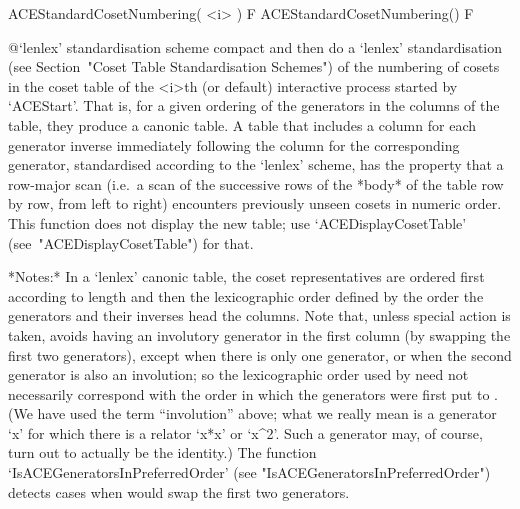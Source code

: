 \>ACEStandardCosetNumbering( <i> ) F
\>ACEStandardCosetNumbering() F

%
{@\noexpand`lenlex' standardisation scheme}
compact and then do a  `lenlex'  standardisation  (see  Section~"Coset
Table Standardisation Schemes") of the  numbering  of  cosets  in  the
coset table of the  <i>th  (or  default)  interactive  {\ACE}  process
started by `ACEStart'. That is, for a given ordering of the generators
in the columns of the table, they produce a  canonic  table.  A  table
that  includes  a  column  for  each  generator  inverse   immediately
following the column for  the  corresponding  generator,  standardised
according to the `lenlex' scheme, has the property  that  a  row-major
scan (i.e.~a scan of the successive rows of the *body*  of  the  table
row by row, from left to right) encounters previously unseen cosets in
numeric order. This function does  not  display  the  new  table;  use
`ACEDisplayCosetTable' (see~"ACEDisplayCosetTable") for that.

*Notes:*
In a `lenlex' canonic table, the  coset  representatives  are  ordered
first according to length and then the lexicographic order defined  by
the order the generators and their inverses  head  the  columns.  Note
that,  unless  special  action  is  taken,  {\ACE}  avoids  having  an
involutory generator in the first column (by swapping  the  first  two
generators), except when there is only  one  generator,  or  when  the
second generator is also an involution;  so  the  lexicographic  order
used by {\ACE} need not necessarily correspond with the order in which
the generators were first put  to  {\ACE}.  (We  have  used  the  term
``involution'' above; what we really mean is  a  generator  `x'  for
which there is a relator `x*x' or `x^2'.  Such  a  generator  may,  of
course,  turn  out  to  actually  be  the  identity.)   The   function
`IsACEGeneratorsInPreferredOrder'                                 (see
"IsACEGeneratorsInPreferredOrder") detects  cases  when  {\ACE}  would
swap the first two generators.

